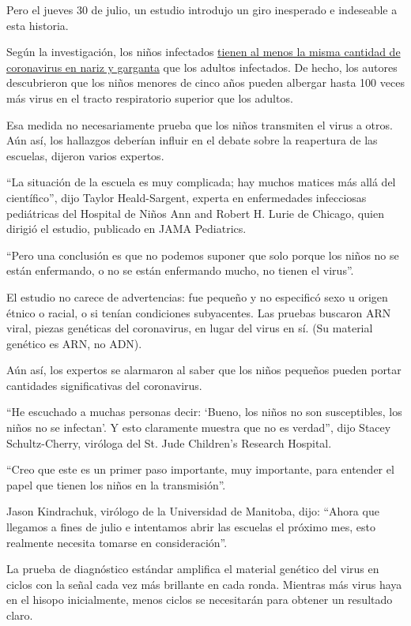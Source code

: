 Pero el jueves 30 de julio, un estudio introdujo un giro inesperado e
indeseable a esta historia.

Según la investigación, los niños infectados
\href{https://jamanetwork.com/journals/jamapediatrics/fullarticle/2768952}{tienen
al menos la misma cantidad de coronavirus en nariz y garganta} que los
adultos infectados. De hecho, los autores descubrieron que los niños
menores de cinco años pueden albergar hasta 100 veces más virus en el
tracto respiratorio superior que los adultos.

Esa medida no necesariamente prueba que los niños transmiten el virus a
otros. Aún así, los hallazgos deberían influir en el debate sobre la
reapertura de las escuelas, dijeron varios expertos.

``La situación de la escuela es muy complicada; hay muchos matices más
allá del científico'', dijo Taylor Heald-Sargent, experta en
enfermedades infecciosas pediátricas del Hospital de Niños Ann and
Robert H. Lurie de Chicago, quien dirigió el estudio, publicado en JAMA
Pediatrics.

``Pero una conclusión es que no podemos suponer que solo porque los
niños no se están enfermando, o no se están enfermando mucho, no tienen
el virus''.

El estudio no carece de advertencias: fue pequeño y no especificó sexo u
origen étnico o racial, o si tenían condiciones subyacentes. Las pruebas
buscaron ARN viral, piezas genéticas del coronavirus, en lugar del virus
en sí. (Su material genético es ARN, no ADN).

Aún así, los expertos se alarmaron al saber que los niños pequeños
pueden portar cantidades significativas del coronavirus.

``He escuchado a muchas personas decir: `Bueno, los niños no son
susceptibles, los niños no se infectan'. Y esto claramente muestra que
no es verdad'', dijo Stacey Schultz-Cherry, viróloga del St. Jude
Children's Research Hospital.

``Creo que este es un primer paso importante, muy importante, para
entender el papel que tienen los niños en la transmisión''.

Jason Kindrachuk, virólogo de la Universidad de Manitoba, dijo: ``Ahora
que llegamos a fines de julio e intentamos abrir las escuelas el próximo
mes, esto realmente necesita tomarse en consideración''.

La prueba de diagnóstico estándar amplifica el material genético del
virus en ciclos con la señal cada vez más brillante en cada ronda.
Mientras más virus haya en el hisopo inicialmente, menos ciclos se
necesitarán para obtener un resultado claro.

